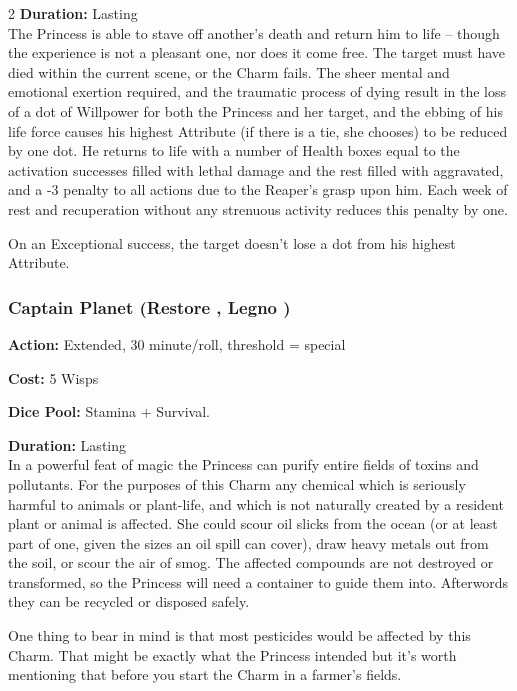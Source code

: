 \begin{multicols}{2}
\noindent \textbf{Duration:} Lasting \\

\noindent The Princess is able to stave off another's death and return him to life -- though the experience is not a pleasant one, nor does it come free. The target must have died within the current scene, or the Charm fails. The sheer mental and emotional exertion required, and the traumatic process of dying result in the loss of a dot of Willpower for both the Princess and her target, and the ebbing of his life force causes his highest Attribute (if there is a tie, she chooses) to be reduced by one dot. He returns to life with a number of Health boxes equal to the activation successes filled with lethal damage and the rest filled with aggravated, and a -3 penalty to all actions due to the Reaper's grasp upon him. Each week of rest and recuperation without any strenuous activity reduces this penalty by one.

On an Exceptional success, the target doesn't lose a dot from his highest Attribute.

\subsubsection*{Captain Planet (Restore \textbullet\textbullet\textbullet\textbullet\textbullet, Legno \textbullet\textbullet\textbullet)}

\noindent \textbf{Action:} Extended, 30 minute/roll, threshold = special

\noindent \textbf{Cost:} 5 Wisps

\noindent \textbf{Dice Pool:} Stamina + Survival.

\noindent \textbf{Duration:} Lasting \\

\noindent In a powerful feat of magic the Princess can purify entire fields of toxins and pollutants. For the purposes of this Charm any chemical which is seriously harmful to animals or plant-life, and which is not naturally created by a resident plant or animal is affected. She could scour oil slicks from the ocean (or at least part of one, given the sizes an oil spill can cover), draw heavy metals out from the soil, or scour the air of smog. The affected compounds are not destroyed or transformed, so the Princess will need a container to guide them into. Afterwords they can be recycled or disposed safely.

One thing to bear in mind is that most pesticides would be affected by this Charm. That might be exactly what the Princess intended but it's worth mentioning that before you start the Charm in a farmer's fields. 


\end{multicols}

